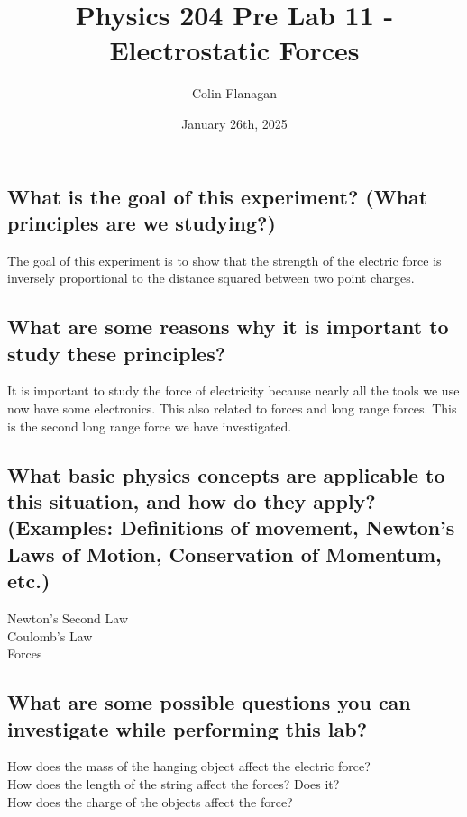\documentclass{article}
\title{Physics 204 Pre Lab 11 - Electrostatic Forces}
\author{Colin Flanagan}
\date{January 26th, 2025}
\begin{document}
\maketitle

\subsection*{What is the goal of this experiment? (What principles are we studying?)}

    The goal of this experiment is to show that the strength of the electric force is inversely proportional to the distance squared between two point charges.
    

\subsection*{What are some reasons why it is important to study these principles?
}

  It is important to study the force of electricity because nearly all the tools we use now have some electronics. This also related to forces and long range forces. This is the second long range force we have investigated. 
    
\subsection*{What basic physics concepts are applicable to this situation, and how do they apply? (Examples: Definitions of movement, Newton’s Laws of Motion, Conservation of Momentum, etc.)}

    Newton's Second Law\\

    Coulomb's Law\\

    Forces\\


\subsection*{What are some possible questions you can investigate while performing this lab?
}

   How does the mass of the hanging object affect the electric force?\\

   How does the length of the string affect the forces? Does it?\\

   How does the charge of the objects affect the force?\\
\end{document}
